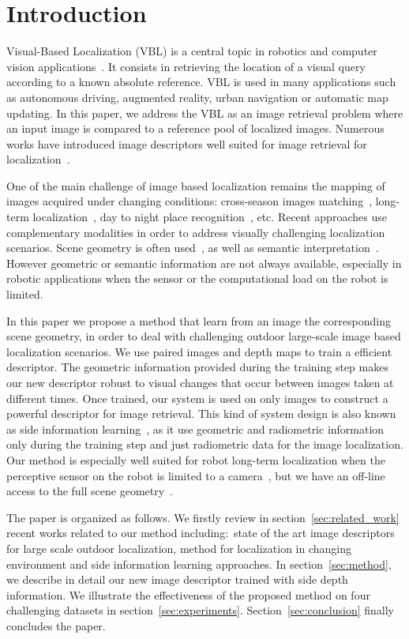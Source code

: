 \section{Introduction}
\label{sec:intro}

Visual-Based Localization (VBL) is a central topic in robotics and computer vision applications~\cite{Piasco2017}. It consists in retrieving the location of a visual query according to a known absolute reference. VBL is used in many applications such as autonomous driving, augmented reality, urban navigation or automatic map updating. In this paper, we address the VBL as an image retrieval problem where an input image is compared to a reference pool of localized images. Numerous works have introduced image descriptors well suited for image retrieval for localization~\cite{Arandjelovic2017,Kim2017a,Gordo2017,Radenovic2017,Liu2018}. 

One of the main challenge of image based localization remains the mapping of images acquired under changing conditions: cross-season images matching~\cite{Naseer2017a}, long-term localization~\cite{Toft2018}, day to night place recognition~\cite{Torii2015}, etc. Recent approaches use complementary modalities in order to address visually challenging localization scenarios. Scene geometry is often used~\cite{Cavallari?,Schonberger2018}, as well as semantic interpretation~\cite{Ardeshir2014,Christie2016,Naseer2017a}. However geometric or semantic information are not always available, especially in robotic applications when the sensor or the computational load on the robot is limited.

In this paper we propose a method that learn from an image the corresponding scene geometry, in order to deal with challenging outdoor large-scale image based localization scenarios. We use paired images and depth maps to train a efficient descriptor. The geometric information provided during the training step makes our new descriptor robust to visual changes that occur between images taken at different times. Once trained, our system is used on only images to construct a powerful descriptor for image retrieval. This kind of system design is also known as side information learning~\cite{Hoffman2016}, as it use geometric and radiometric information only during the training step and just radiometric data for the image localization. Our method is especially well suited for robot long-term localization when the perceptive sensor on the robot is limited to a camera~\cite{Middelberg2014}, but we have an off-line access to the full scene geometry~\cite{Paparoditis2012,Maddern2016,Wang2016}. 

The paper is organized as follows. We firstly review in section~\ref{sec:related_work} recent works related to our method including:~state of the art image descriptors for large scale outdoor localization, method for localization in changing environment and side information learning approaches. In section~\ref{sec:method}, we describe in detail our new image descriptor trained with side depth information. We illustrate the effectiveness of the proposed method on four challenging datasets in section~\ref{sec:experiments}. Section~\ref{sec:conclusion} finally concludes the paper.
